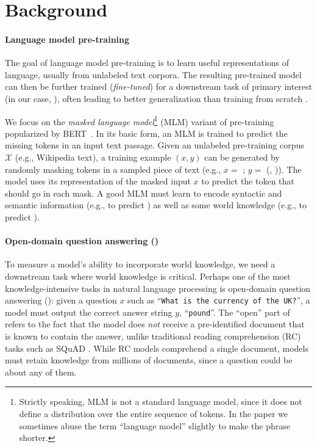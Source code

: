 \section{Background}
\label{sec:background}
\paragraph{Language model pre-training}

The goal of language model pre-training is to learn useful representations of language,
usually from unlabeled text corpora.
The resulting pre-trained model can then be further trained (\emph{fine-tuned}) for a downstream task of primary interest (in our case, \openqa),
often leading to better generalization than training from scratch \cite{dai_finetune,gpt2}.

We focus on the {\em masked language model}\footnote{Strictly speaking, MLM is not a standard language model, since it does not define a distribution over the entire sequence of tokens. In the paper we sometimes abuse the term ``language model'' slightly to make the phrase shorter.}
(MLM) variant of pre-training popularized by BERT~\cite{bert}.
In its basic form, an MLM is trained to predict the missing tokens in an input text passage.
Given an unlabeled pre-training corpus $\mathcal{X}$ (e.g., Wikipedia text),
a training example $(x, y)$ can be generated by randomly masking tokens in a sampled piece of text
(e.g., $x =$ ; $y =$ (, )).
The model uses its representation of the masked input $x$ to predict
the token that should go in each mask.
A good MLM must learn to encode syntactic and semantic information (e.g., to predict )
as well as some world knowledge (e.g., to predict ).

\paragraph{Open-domain question answering (\openqa)}
To measure a model's ability to incorporate world knowledge, we need a downstream task where world knowledge is critical.
Perhaps one of the most knowledge-intensive tasks in natural language processing is open-domain question answering (\openqa):
given a question $x$ such as ``\texttt{\small What is the currency of the UK?}'', a model must output the correct answer string $y$, ``\texttt{{\small pound}}''.
The ``open'' part of \openqa refers to the fact that the model does {\em not} receive a pre-identified document that is known to contain the answer, unlike traditional reading comprehension (RC) tasks such as SQuAD \cite{squad, squad2}. While RC models comprehend a single document, \openqa models must retain knowledge from millions of documents, since a question could be about any of them.

